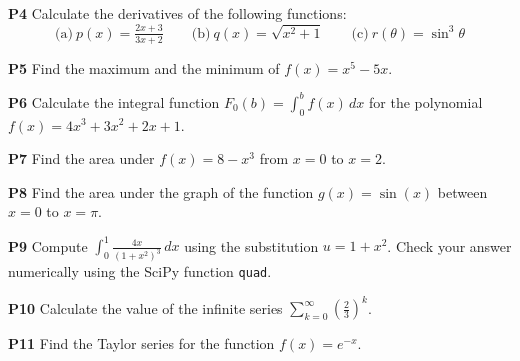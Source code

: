 \documentclass[10pt]{IEEEtran}
\begin{document}
	\noindent
	\textbf{P4}	
		Calculate the derivatives of the following functions:
		\[
			\text{(a)}~p(x) = \tfrac{2x + 3}{3x + 2}
			\qquad
			\text{(b)}~q(x) = \sqrt{x^2 + 1}
			\qquad
			\text{(c)}~r(\theta) =  \sin^3 \theta
		\]

	\noindent
	\textbf{P5}	
		Find the maximum and the minimum of $f(x) = x^5-5x$.


	\noindent
	\textbf{P6}	
		Calculate the integral function $F_0(b) = \int_0^b f(x)\,dx$
		for the polynomial $f(x) = 4x^3 + 3x^2 + 2x + 1$.

	\noindent
	\textbf{P7}	
		Find the area under $f(x)=8-x^3$ from $x=0$ to $x=2$.

	\noindent
	\textbf{P8}	
		Find the area under the graph of the function $g(x)=\sin(x)$ between $x=0$ to $x=\pi$.

	\noindent
	\textbf{P9}	
		Compute $\int_{0}^{1} \frac{4x}{(1+x^2)^3}\,dx$
		using the substitution $u = 1 + x^2$.
		Check your answer numerically using the SciPy function \texttt{quad}.

	\noindent
	\textbf{P10}	
		Calculate the value of the infinite series $\sum_{k=0}^\infty  \left(\frac{2}{3}\right)^{\!k}$.

	\noindent
	\textbf{P11}	
		Find the Taylor series for the function $f(x) = e^{-x}$.


	\noindent
\end{document}
